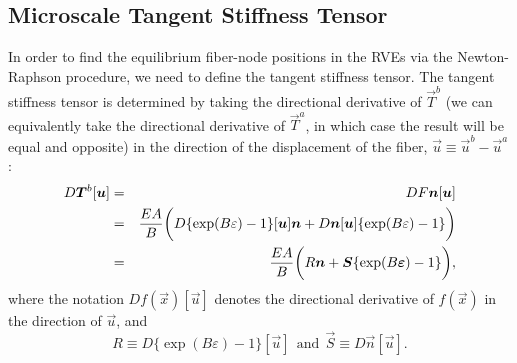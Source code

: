 \subsection{Microscale Tangent Stiffness Tensor}
\label{subsec:tangent_stiffness_tensor}

In order to find the equilibrium fiber-node positions in the RVEs via the Newton-Raphson procedure, we need to define the tangent stiffness tensor. The tangent stiffness tensor is determined by taking the directional derivative of $\vec{T}^b$ (we can equivalently take the directional derivative of $\vec{T}^a$, in which case the result will be equal and opposite) in the direction of the displacement of the fiber, $\vec{u} \equiv \vec{u}^b - \vec{u}^a$:
%
\begin{eqnarray}
D\bm{T}^b [\bm{u}] &=& D F \bm{n} [\bm{u}] \nonumber\\
&=& \frac{E A}{B} \bigg(D \{ \exp(B \varepsilon) - 1\} [\bm{u}] \bm{n}+ D \bm{n} [\bm{u}] \{ \exp(B \varepsilon) - 1\} \bigg) \nonumber\\
&=& \frac{E A}{B} \bigg( R \bm{n} + \bm{S}\{\exp(B \bm{\varepsilon}) - 1\} \bigg),
\label{DT_i}
\end{eqnarray}
%
where the notation $D f(\vec{x}) [\vec{u}]$ denotes the directional derivative of $f(\vec{x})$ in the direction of $\vec{u}$, and 
% 
\begin{equation}
R \equiv D \{ \exp(B \varepsilon) - 1\} [\vec{u}] \ \ \text{and} \ \
\vec{S} \equiv D \vec{n} [\vec{u}].
\end{equation}
%

